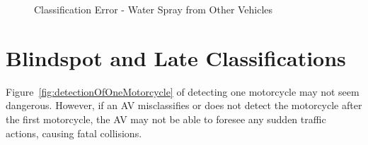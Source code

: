 \documentclass[12pt]{report} %
\begin{document}
\begin{figure}[hb]
\begin{floatrow}
				{
					\caption{Classification Error - Water Spray from Other Vehicles}
					\label{fig:detectionOfMotorcycleW3}
				}
			\end{floatrow}
		\end{figure}

	\section{Blindspot and Late Classifications}
		Figure~\ref{fig:detectionOfOneMotorcycle} of detecting one motorcycle may not seem dangerous. However, if an AV misclassifies or does not detect the motorcycle after the first motorcycle, the AV may not be able to foresee any sudden traffic actions, causing fatal collisions.
\end{document}
